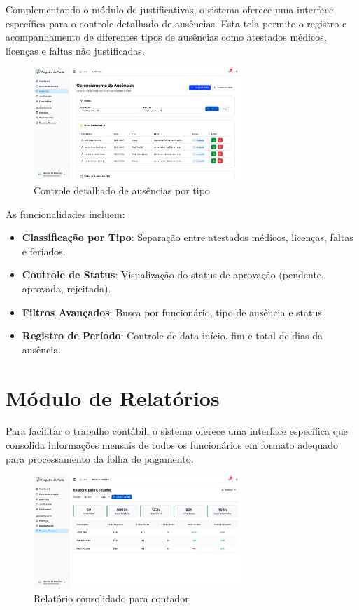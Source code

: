 Complementando o módulo de justificativas, o sistema oferece uma interface específica para o controle detalhado de ausências. Esta tela permite o registro e acompanhamento de diferentes tipos de ausências como atestados médicos, licenças e faltas não justificadas.

\begin{figure}[H]
\centering
\includegraphics[width=0.7\textwidth]{imagens/controle-ausencias.png}
\caption{Controle detalhado de ausências por tipo}
\label{fig:controle-ausencias}
\end{figure}

As funcionalidades incluem:

\begin{itemize}
\item \textbf{Classificação por Tipo}: Separação entre atestados médicos, licenças, faltas e feriados.
\item \textbf{Controle de Status}: Visualização do status de aprovação (pendente, aprovada, rejeitada).
\item \textbf{Filtros Avançados}: Busca por funcionário, tipo de ausência e status.
\item \textbf{Registro de Período}: Controle de data início, fim e total de dias da ausência.
\end{itemize}

\section{Módulo de Relatórios}

Para facilitar o trabalho contábil, o sistema oferece uma interface específica que consolida informações mensais de todos os funcionários em formato adequado para processamento da folha de pagamento.

\begin{figure}[H]
\centering
\includegraphics[width=0.7\textwidth]{imagens/relatorio-contador.png}
\caption{Relatório consolidado para contador}
\label{fig:relatorio-contador}
\end{figure}

